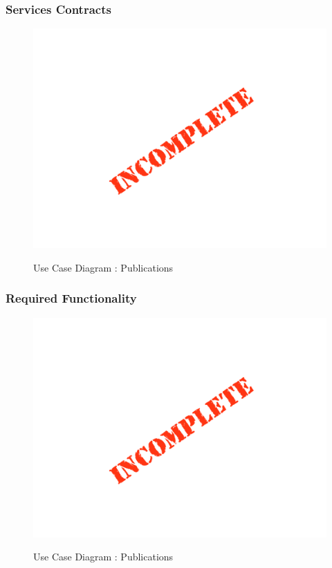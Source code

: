 \documentclass{article}
\begin{document}
		\subsubsection{Services Contracts}

		\begin{figure}[H]
		\includegraphics[width=\textwidth]{images/Incomplete.png}  \\
		\caption{Use Case Diagram : Publications}
		\end{figure}

		\subsubsection{Required Functionality}

		\begin{figure}[H]
		\includegraphics[width=\textwidth]{images/Incomplete.png}  \\
		\caption{Use Case Diagram : Publications}
		\end{figure}
\end{document}
